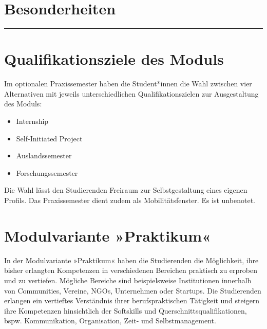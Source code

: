 \hypertarget{besonderheitenpathlabel....srcmodulbeschreibungen-bachelor-bpo5ba_praxissemester}{%
\section*{Besonderheiten\label{../../src/modulbeschreibungen-bachelor-bpo5/BA_Praxissemester}}\label{besonderheitenpathlabel....srcmodulbeschreibungen-bachelor-bpo5ba_praxissemester}}

\begin{center}\rule{0.5\linewidth}{0.5pt}\end{center}

\hypertarget{qualifikationsziele-des-modulspathlabel....srcmodulbeschreibungen-bachelor-bpo5ba_praxissemester}{%
\section*{Qualifikationsziele des
Moduls\label{../../src/modulbeschreibungen-bachelor-bpo5/BA_Praxissemester}}\label{qualifikationsziele-des-modulspathlabel....srcmodulbeschreibungen-bachelor-bpo5ba_praxissemester}}

Im optionalen Praxissemester haben die Student*innen die Wahl zwischen
vier Alternativen mit jeweils unterschiedlichen Qualifikationszielen zur
Ausgestaltung des Moduls:

\begin{itemize}
\tightlist
\item
  Internship
\item
  Self-Initiated Project
\item
  Auslandssemester
\item
  Forschungssemester
\end{itemize}

Die Wahl lässt den Studierenden Freiraum zur Selbstgestaltung eines
eigenen Profils. Das Praxissemester dient zudem als Mobilitätsfenster.
Es ist unbenotet.

\hypertarget{modulvariante-praktikumpathlabel....srcmodulbeschreibungen-bachelor-bpo5ba_praxissemester}{%
\section*{Modulvariante
»Praktikum«\label{../../src/modulbeschreibungen-bachelor-bpo5/BA_Praxissemester}}\label{modulvariante-praktikumpathlabel....srcmodulbeschreibungen-bachelor-bpo5ba_praxissemester}}

In der Modulvariante »Praktikum« haben die Studierenden die Möglichkeit,
ihre bisher erlangten Kompetenzen in verschiedenen Bereichen praktisch
zu erproben und zu vertiefen. Mögliche Bereiche sind beispielsweise
Institutionen innerhalb von Communities, Vereine, NGOs, Unternehmen oder
Startups. Die Studierenden erlangen ein vertieftes Verständnis ihrer
berufspraktischen Tätigkeit und steigern ihre Kompetenzen hinsichtlich
der Softskills und Querschnittsqualifikationen, bspw. Kommunikation,
Organisation, Zeit- und Selbstmanagement.

